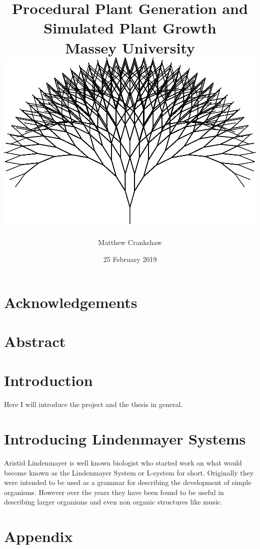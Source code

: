 \documentclass[11pt]{report}
\title{
{ Procedural Plant Generation and Simulated Plant Growth }\\
{\large Massey University}
\\
\vspace{2cm}
{\includegraphics[scale=0.35]{titlepage.png}}
\vspace{2cm}
}
\author{Matthew Crankshaw}
\date{25 February 2019}
\begin{document}
\maketitle

\chapter*{Acknowledgements}

\chapter*{Abstract}

\tableofcontents
\listoffigures


\chapter{Introduction}

Here I will introduce the project and the thesis in general.




\chapter{Introducing Lindenmayer Systems}

Aristid Lindenmayer is well known biologist who started work on what would become known as the Lindenmayer System or L-system for short. Originally they were intended to be used as a grammar for describing the development of simple organisms. However over the years they have been found to be useful in describing larger organisms and even non organic structures like music. \cite{worth2005growing} 





\appendix
\chapter{Appendix}

\end{document}
